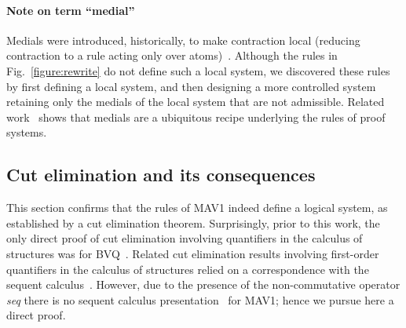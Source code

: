\documentclass[UKenglish,acmsmall,authorversion]{acmart}
\theoremstyle{plain}
\begin{document}


\paragraph{Note on term ``medial''} Medials were introduced, historically, to make contraction local (reducing contraction to a rule acting only over atoms)~\cite{Brunnler2001}.
Although the rules in Fig.~\ref{figure:rewrite} do not define such a local system, we discovered these rules by first
defining a local system, and then designing a more controlled system retaining only the medials of the local system that are not admissible.
Related work~\cite{Tubella2018} shows that medials are a ubiquitous recipe underlying the rules of proof systems.





\subsection{Cut elimination and its consequences}
\label{section:implication}

This section confirms that the rules of \textsf{MAV1} indeed define a logical system, as established by a cut elimination theorem.
Surprisingly, prior to this work, the only direct proof of cut elimination involving quantifiers in the calculus of structures was for \textsf{BVQ}~\cite{Roversi14}.
Related cut elimination results involving first-order quantifiers in the calculus of structures relied on a correspondence with the sequent calculus~\cite{Brunnler2006,Strassburger09}.
However, due to the presence of the non-commutative operator \textit{seq} there is no sequent calculus presentation~\cite{Tiu2006} for \textsf{MAV1}; hence we pursue here a direct proof.
\end{document}
